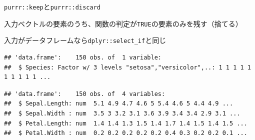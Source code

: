 \documentclass[ignorenonframetext,]{beamer}
\newenvironment{Shaded}{\begin{snugshade}}{\end{snugshade}}
\newcommand{\KeywordTok}[1]{\textcolor[rgb]{0.13,0.29,0.53}{\textbf{#1}}}
\newcommand{\StringTok}[1]{\textcolor[rgb]{0.31,0.60,0.02}{#1}}
\newcommand{\OperatorTok}[1]{\textcolor[rgb]{0.81,0.36,0.00}{\textbf{#1}}}
\newcommand{\NormalTok}[1]{#1}
\begin{document}
\begin{frame}[fragile]{\texttt{purrr::keep}と\texttt{purrr::discard}}

入力ベクトルの要素のうち、関数の判定が\texttt{TRUE}の要素のみを残す（捨てる）

入力がデータフレームなら\texttt{dplyr::select\_if}と同じ

\begin{Shaded}
\end{Shaded}

\begin{verbatim}
## 'data.frame':    150 obs. of  1 variable:
##  $ Species: Factor w/ 3 levels "setosa","versicolor",..: 1 1 1 1 1 1 1 1 1 1 ...
\end{verbatim}

\begin{Shaded}
\end{Shaded}

\begin{verbatim}
## 'data.frame':    150 obs. of  4 variables:
##  $ Sepal.Length: num  5.1 4.9 4.7 4.6 5 5.4 4.6 5 4.4 4.9 ...
##  $ Sepal.Width : num  3.5 3 3.2 3.1 3.6 3.9 3.4 3.4 2.9 3.1 ...
##  $ Petal.Length: num  1.4 1.4 1.3 1.5 1.4 1.7 1.4 1.5 1.4 1.5 ...
##  $ Petal.Width : num  0.2 0.2 0.2 0.2 0.2 0.4 0.3 0.2 0.2 0.1 ...
\end{verbatim}

\end{frame}
\end{document}

